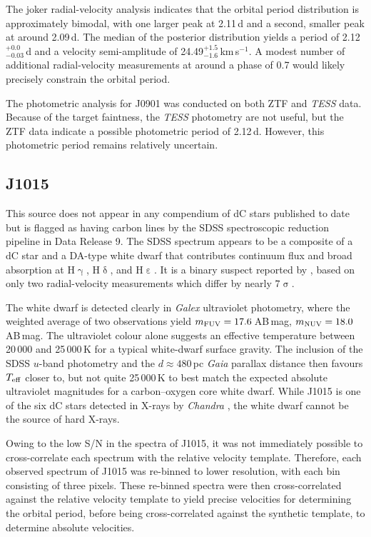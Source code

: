 \documentclass[fleqn,usenatbib,useAMS]{mnras}
\begin{document}
The {\sc joker} radial-velocity analysis indicates that the orbital period distribution is approximately bimodal, with one larger peak at 2.11\,d and a second, smaller peak at around 2.09\,d.  The median of the posterior distribution yields a period of 2.12$^{+0.0}_{-0.03}$\,d and a velocity semi-amplitude of 24.49$^{+1.5}_{-1.6}$\,km\,s$^{-1}$.  A modest number of additional radial-velocity measurements at around a phase of 0.7 would likely precisely constrain the orbital period.  

The photometric analysis for J0901 was conducted on both ZTF and {\em TESS} data.  Because of the target faintness, the {\em TESS} photometry are not useful, but the ZTF data indicate a possible photometric period of 2.12\,d.  However, this photometric period remains relatively uncertain.




\subsection{J1015}

This source does not appear in any compendium of dC stars published to date but is flagged as having carbon lines by the SDSS spectroscopic reduction pipeline in Data Release 9.  The SDSS spectrum appears to be a composite of a dC star and a DA-type white dwarf that contributes continuum flux and broad absorption at H$\upgamma$, H$\updelta$, and H$\upepsilon$.  It is a binary suspect reported by \citet{Whitehouse18}, based on only two radial-velocity measurements which differ by nearly $7\upsigma$.

The white dwarf is detected clearly in {\em Galex} ultraviolet photometry, where the weighted average of two observations yield $m_{\rm FUV}=17.6$\,AB\,mag, $m_{\rm NUV}=18.0$\,AB\,mag.  The ultraviolet colour alone suggests an effective temperature between 20\,000 and 25\,000\,K for a typical white-dwarf surface gravity.  The inclusion of the SDSS $u$-band photometry and the $d\approx480$\,pc {\em Gaia} parallax distance then favours $T_{\rm eff}$ closer to, but not quite 25\,000\,K to best match the expected absolute ultraviolet magnitudes for a carbon--oxygen core white dwarf.  While J1015 is one of the six dC stars detected in X-rays by {\em Chandra} \citep{Green19}, the white dwarf cannot be the source of hard X-rays.  

Owing to the low S/N in the spectra of J1015, it was not immediately possible to cross-correlate each spectrum with the relative velocity template.  Therefore, each observed spectrum of J1015 was re-binned to lower resolution, with each bin consisting of three pixels.  These re-binned spectra were then cross-correlated against the relative velocity template to yield precise velocities for determining the orbital period, before being cross-correlated against the synthetic template, to determine absolute velocities.  
\end{document}
